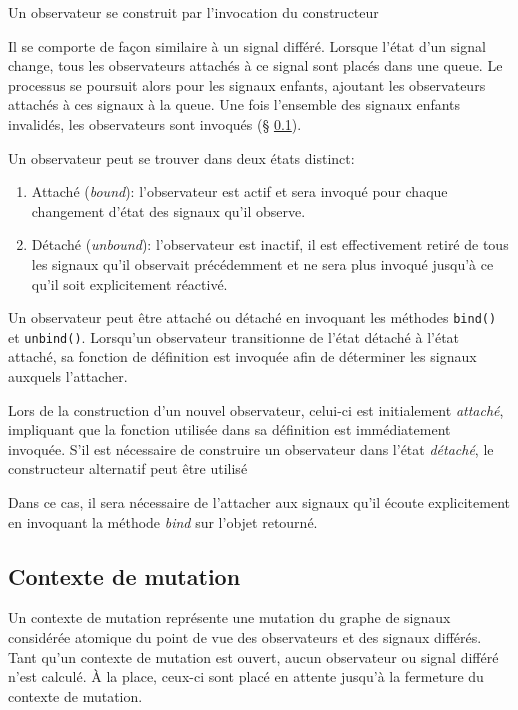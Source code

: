 Un observateur se construit par l'invocation du constructeur
\begin{center}
\end{center}

Il se comporte de façon similaire à un signal différé. Lorsque l'état d'un signal change, tous les observateurs attachés à ce signal sont placés dans une queue. Le processus se poursuit alors pour les signaux enfants, ajoutant les observateurs attachés à ces signaux à la queue. Une fois l'ensemble des signaux enfants invalidés, les observateurs sont invoqués (§ \ref{sec:sig-mut-context}).

Un observateur peut se trouver dans deux états distinct:
\begin{enumerate}
	\item Attaché (\emph{bound}): l'observateur est actif et sera invoqué pour chaque changement d'état des signaux qu'il observe.
	\item Détaché (\emph{unbound}): l'observateur est inactif, il est effectivement retiré de tous les signaux qu'il observait précédemment et ne sera plus invoqué jusqu'à ce qu'il soit explicitement réactivé.
\end{enumerate}

Un observateur peut être attaché ou détaché en invoquant les méthodes \texttt{bind()} et \texttt{unbind()}. Lorsqu'un observateur transitionne de l'état détaché à l'état attaché, sa fonction de définition est invoquée afin de déterminer les signaux auxquels l'attacher.

Lors de la construction d'un nouvel observateur, celui-ci est initialement \emph{attaché}, impliquant que la fonction utilisée dans sa définition est immédiatement invoquée. S'il est nécessaire de construire un observateur dans l'état \emph{détaché}, le constructeur alternatif peut être utilisé
\begin{center}
\end{center}
Dans ce cas, il sera nécessaire de l'attacher aux signaux qu'il écoute explicitement en invoquant la méthode \emph{bind} sur l'objet retourné.

\subsection{Contexte de mutation} \label{sec:sig-mut-context}

Un contexte de mutation représente une mutation du graphe de signaux considérée atomique du point de vue des observateurs et des signaux différés. Tant qu'un contexte de mutation est ouvert, aucun observateur ou signal différé n'est calculé. À la place, ceux-ci sont placé en attente jusqu'à la fermeture du contexte de mutation.


